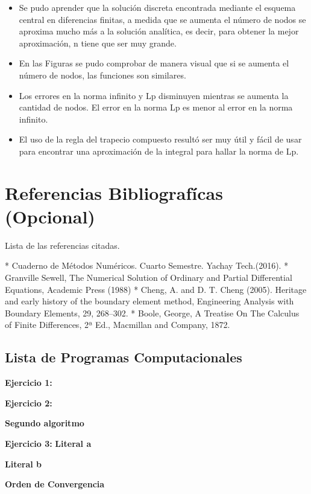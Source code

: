 \documentclass[paper=a4, parskip=full, fontsize=12pt]{scrartcl} %
\numberwithin{equation}{section} %
\numberwithin{figure}{section} %
\numberwithin{table}{section} %
\begin{document}
\begin{itemize}
    \item Se pudo aprender que la soluci\'on discreta encontrada mediante el esquema central en diferencias finitas, a medida que se aumenta el n\'umero de nodos se aproxima mucho m\'as a la solución anal\'itica, es decir, para obtener la mejor aproximaci\'on, n tiene que ser muy grande.\\
    \item En las Figuras se pudo comprobar de manera visual que si se aumenta el número de nodos, las funciones son similares.\\
    \item Los errores en la norma infinito y Lp disminuyen mientras se aumenta la cantidad de nodos. El error en la norma Lp es menor al error en la norma infinito.\\
    \item El uso de la regla del trapecio compuesto result\'o ser muy \'util y f\'acil de usar para encontrar una aproximaci\'on de la integral para hallar la norma de Lp.\\
\end{itemize}

\section{Referencias Bibliograf\'icas (Opcional)}\label{sect_ref_bib}
Lista de las referencias citadas.

* Cuaderno de M\'etodos Num\'ericos. Cuarto Semestre. Yachay Tech.(2016).
* Granville Sewell, The Numerical Solution of Ordinary and Partial Differential Equations, Academic Press (1988)
* Cheng, A. and D. T. Cheng (2005). Heritage and early history of the boundary element method, Engineering Analysis with Boundary Elements, 29, 268–302.
* Boole, George, A Treatise On The Calculus of Finite Differences, 2ª Ed., Macmillan and Company, 1872.


\newpage

\begin{appendices}
\section{Lista de Programas Computacionales}

\textbf{Ejercicio 1:}



\textbf{Ejercicio 2:}


\textbf{Segundo algoritmo}


\textbf{Ejercicio 3:}
\textbf{Literal a}


\textbf{Literal b}


\textbf{Orden de Convergencia }









\end{appendices}

\end{document}
